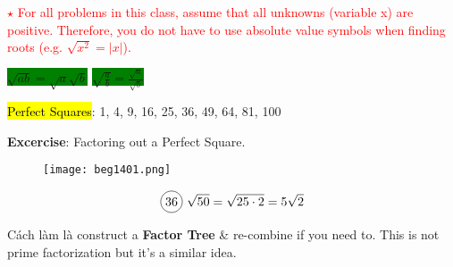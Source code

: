 \textcolor{red}{{\LARGE $\star$} For all problems in this class, assume that all unknowns (variable x) are positive. Therefore, you do not have to use absolute value symbols when finding roots (e.g. $\sqrt{x^{2}}=|x|$).}

\begin{tcolorbox}[
  enhanced,attach boxed title to top center={yshift=-3mm,yshifttext=-1mm},
  colback=blue!5!white,colframe=blue!75!black,colbacktitle=red!80!black,
  title=Root Rules,fonttitle=\bfseries,
  boxed title style={size=small,colframe=red!50!black}
]
  \hspace{2cm}
  \colorbox{green}{$\sqrt{ab}=\sqrt{a}\sqrt{b}$}
  \hspace{7cm}
  \colorbox{green}{$\sqrt{\frac{a}{b}}=\frac{\sqrt{a}}{\sqrt{b}}$}
\end{tcolorbox}

\hl{Perfect Squares}: 1, 4, 9, 16, 25, 36, 49, 64, 81, 100

\vspace{.4cm}

\newpage

\textbf{Excercise}: Factoring out a Perfect Square.

\begin{figure}[htb!]
  \centering
  \texttt{[image: beg1401.png]}
\end{figure}

\[\circled{36}\ \sqrt{50}=\sqrt{25 \cdot 2}=5\sqrt{2}\]

Cách làm là construct a \textbf{Factor Tree} \& re-combine if you need to. This is not prime factorization but it's a similar idea.

\vspace{.4cm}

